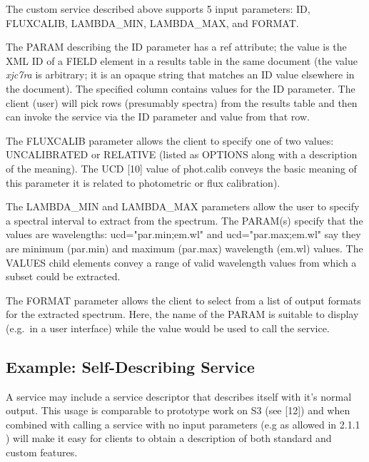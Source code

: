 \documentclass[11pt,a4paper]{ivoa}
\begin{document}
The custom service described above supports 5 input parameters: ID,
FLUXCALIB, LAMBDA\_MIN, LAMBDA\_MAX, and FORMAT.

The PARAM describing the ID parameter has a ref attribute; the value is
the XML ID of a FIELD element in a results table in the same document
(the value {\em xjc7ra\/} is arbitrary;
it is an opaque string that matches
an ID value elsewhere in the document). The specified column contains
values for the ID parameter. The client (user) will pick rows (presumably
spectra) from the results table and then can invoke the service via the
ID parameter and value from that row.

The FLUXCALIB parameter allows the client to specify one of two values:
UNCALIBRATED or RELATIVE (listed as OPTIONS along with a description of
the meaning). The UCD [10] value of phot.calib conveys the basic meaning
of this parameter it is related to photometric or flux calibration).

The LAMBDA\_MIN and LAMBDA\_MAX parameters allow the user to specify a
spectral interval to extract from the spectrum. The PARAM(s) specify that
the values are wavelengths: ucd="par.min;em.wl" and ucd="par.max;em.wl"
say they are minimum (par.min) and maximum (par.max) wavelength (em.wl)
values. The VALUES child elements convey a range of valid wavelength
values from which a subset could be extracted.

The FORMAT parameter allows the client to select from a list of output
formats for the extracted spectrum. Here, the name of the PARAM is
suitable to display (e.g.\ in a user interface) while the value would be
used to call the service.


\subsection{Example: Self-Describing Service}

A service may include a service descriptor that describes itself with
it's normal output. This usage is comparable to prototype work on S3 (see
[12]) and when combined with calling a service with no input parameters
(e.g as allowed in 2.1.1 ) will make it easy for clients to obtain a
description of both standard and custom features.
\end{document}
